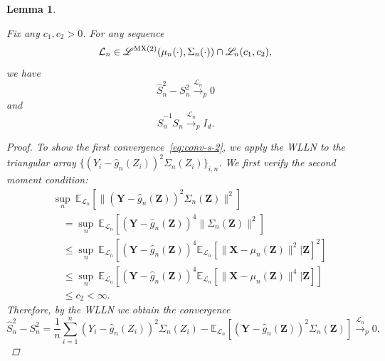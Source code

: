 \documentclass[12pt]{article}
\newtheorem{lemma}{Lemma}
\theoremstyle{definition}
\theoremstyle{remark}
\newcommand{\prx}{\bm X}
\newcommand{\prz}{\bm Z}
\newcommand{\srz}{Z}
\newcommand{\pry}{{\bm Y}}
\newcommand{\sry}{Y}
\begin{document}
\begin{lemma}\label{lem:aux}
	
	Fix any $c_1, c_2 > 0$. For any sequence
	\begin{equation}
		\mathcal L_n \in \mathscr L^{\textnormal{MX(2)}}(\mu_n(\cdot), \Sigma_n(\cdot)) \cap \mathscr L_n(c_1, c_2),
	\end{equation}
	we have
	\begin{equation}
		\widehat S_n^2 - S_n^2 \overset{\mathcal L_n}\rightarrow_p  0
		\label{eq:conv-s-2}
	\end{equation}
	and
	\begin{equation}
		\widehat S_n^{-1}S_n \overset{\mathcal L_n}\rightarrow_p I_d.
		\label{eq:conv-s-neg-1}
	\end{equation}
	
	\begin{proof}
		To show the first convergence~\eqref{eq:conv-s-2}, we apply the WLLN to the triangular array $\{(\sry_{i} - \widehat g_n(\srz_{i}))^2\Sigma_n(\srz_i)\}_{i,n}$. We first verify the second moment condition:
		\begin{equation}
			\begin{split}
				&\sup_{n}\ \mathbb E_{\mathcal L_n}[\|(\pry - \widehat g_n(\prz))^2\Sigma_n(\prz)\|^2] \\
				&\quad= \sup_{n}\ \mathbb E_{\mathcal L_n}[(\pry - \widehat g_n(\prz))^4\|\Sigma_n(\prz)\|^2] \\
				&\quad\leq \sup_{n}\ \mathbb E_{\mathcal L_n}[(\pry - \widehat g_n(\prz))^4\mathbb E_{\mathcal L_n}[\|\prx - \mu_n(\prz)\|^2|\prz]^2] \\
				&\quad\leq \sup_{n}\ \mathbb E_{\mathcal L_n}[(\pry - \widehat g_n(\prz))^4\mathbb E_{\mathcal L_n}[\|\prx - \mu_n(\prz)\|^4|\prz]] \\
				&\quad \leq  c_2 < \infty.
			\end{split}
			\label{eq:eighth-moment-calculation}
		\end{equation} 
		Therefore, by the WLLN we obtain the convergence
		\begin{equation}
			\widehat S_n^{2} - S_n^2 =  \frac{1}{n}\sum_{i = 1}^n (\sry_{i} - \widehat g_n(\srz_{i}))^2\Sigma_n(\srz_i) - \mathbb E_{\mathcal L_n}[(\pry - \widehat g_n(\prz))^2\Sigma_n(\prz)]\overset{\mathcal L_n}\rightarrow_p 0.
		\end{equation}
		

\end{proof}
\end{lemma}
\end{document}
